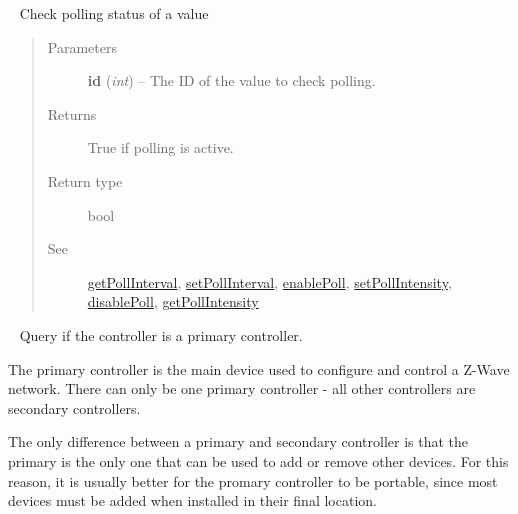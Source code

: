 \documentclass[letterpaper,10pt,english]{sphinxmanual}
\begin{document}
\begin{fulllineitems}
\begin{fulllineitems}
\begin{quote}
\begin{description}
\end{description}\end{quote}

\end{fulllineitems}


\begin{fulllineitems}
\label{libopenzwave:libopenzwave.PyManager.isPolled}~\label{libopenzwave:ispolled}
Check polling status of a value
\begin{quote}\begin{description}
\item[{Parameters}] \leavevmode
\textbf{id} (\emph{int}) -- The ID of the value to check polling.

\item[{Returns}] \leavevmode
True if polling is active.

\item[{Return type}] \leavevmode
bool

\item[{See}] \leavevmode
{\hyperref[libopenzwave:getpollinterval]{getPollInterval}}, {\hyperref[libopenzwave:setpollinterval]{setPollInterval}}, {\hyperref[libopenzwave:enablepoll]{enablePoll}}, {\hyperref[libopenzwave:setpollintensity]{setPollIntensity}}, {\hyperref[libopenzwave:disablepoll]{disablePoll}}, {\hyperref[libopenzwave:getpollintensity]{getPollIntensity}}

\end{description}\end{quote}

\end{fulllineitems}


\begin{fulllineitems}
\label{libopenzwave:libopenzwave.PyManager.isPrimaryController}~\label{libopenzwave:isprimarycontroller}
Query if the controller is a primary controller.

The primary controller is the main device used to configure and control a
Z-Wave network.  There can only be one primary controller - all other
controllers are secondary controllers.

The only difference between a primary and secondary controller is that the
primary is the only one that can be used to add or remove other devices.  For
this reason, it is usually better for the promary controller to be portable,
since most devices must be added when installed in their final location.


\end{fulllineitems}
\end{fulllineitems}
\end{document}
